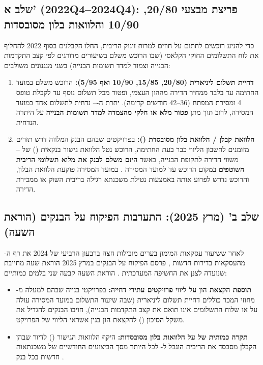 \subsection{שלב א' (\num{2022Q4}--\num{2024Q4}): פריצת מבצעי \num{20/80}, \num{10/90} והלוואות בלון מסובסדות}
כדי להניע רוכשים לחתום על חוזים למרות זינוק הריבית, החלו הקבלנים בסוף \num{2022} להחליף את לוח התשלומים החוקי הקלאסי (שבו הרוכש משלם בשיעורים מדורגים לפי קצב התקדמות הבנייה וצמוד למדד תשומות הבנייה) בשני מנגנונים משולבים:
\begin{enumerate}[label=\textbf{\arabic*.},rightmargin=0.6cm]
  \item \textbf{דחיית תשלום ליניארית (\num{20/80}, \num{15/85}, \num{10/90} ואף \num{5/95}):} הרוכש משלם במועד החתימה  עד  בלבד ממחיר הדירה מההון העצמי, ופטור מכל תשלום נוסף עד לקבלת טופס \num{4} ומסירת המפתח (\num{36}--\num{42} חודשים קדימה). יתרת ה--- נדחית לתשלום אחד במועד המסירה, לרוב תוך מתן \textbf{פטור מלא או חלקי מהצמדה למדד תשומות הבנייה} על היתרה הנדחית.
  \item \textbf{הלוואת קבלן / הלוואת בלון מסובסדת ():} בפרויקטים שבהם הבנק המלווה דרש תזרים מזומנים לחשבון הליווי כבר בעת החתימה, הרוכש נטל הלוואת גישור בנקאית () של -- משווי הדירה לתקופת הבנייה, כאשר \textbf{היזם משלם לבנק את מלוא תשלומי הריבית השוטפים} במקום הרוכש עד למועד המסירה \cite{boi2025stability,boi2025directive}. במועד המסירה פוקעת הלוואת הבלון, והרוכש נדרש לפרוע אותה באמצעות נטילת משכנתא רגילה בריבית השוק או ממכירת הדירה.
\end{enumerate}

\subsection{שלב ב' (מרץ \num{2025}): התערבות הפיקוח על הבנקים (הוראת השעה)}
לאחר ששיעור עסקאות המימון בערים מובילות חצה ברבעון הרביעי של \num{2024} את רף ה- מהעסקאות בדירות חדשות \cite{mof2025economist}, פרסם הפיקוח על הבנקים במרץ \num{2025} הוראת שעה מחייבת שנועדה לצנן את החשיפה המערכתית \cite{boi2025directive}. הוראת השעה קבעה שני בלמים כמותיים:
\begin{itemize}[rightmargin=0.6cm]
  \item \textbf{תוספת הקצאת הון על ליווי פרויקטים עתירי דחייה:} בפרויקטי בנייה שבהם למעלה מ- מחוזי המכר כוללים דחיית תשלום ליניארית (שבה שיעור התשלום במועד המסירה עולה על  או שלוח התשלומים אינו תואם את קצב התקדמות הבנייה), חויבו הבנקים להגדיל את משקל הסיכון () להקצאת הון בגין אשראי הליווי של הפרויקט.
  \item \textbf{תקרה כמותית של  על הלוואות בלון מסובסדות:} היקף הלוואות הגישור () לדיור שבהן הקבלן מסבסד את הריבית הוגבל ל- לכל היותר מסך הביצועים החודשיים של משכנתאות חדשות בכל בנק \cite{boi2025directive}.
\end{itemize}

